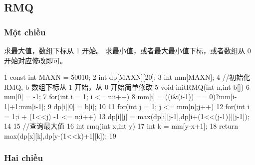 \documentclass[11pt]{article}
\begin{document}
\subsection{RMQ}

\subsubsection{Một chiều}

\begin{Code}
     求最大值，数组下标从 1 开始。
     求最小值，或者最大最小值下标，或者数组从 0 开始对应修改即可。

 1   const int MAXN = 50010;
 2   int dp[MAXN][20];
 3   int mm[MAXN];
 4   //初始化 RMQ, b 数组下标从 1 开始，从 0 开始简单修改
 5   void initRMQ(int n,int b[]){
 6       mm[0] = -1;
 7       for(int i = 1; i <= n;i++){
 8           mm[i] = ((i&(i-1)) == 0)?mm[i-1]+1:mm[i-1];
 9           dp[i][0] = b[i];
10       }
11       for(int j = 1; j <= mm[n];j++)
12           for(int i = 1;i + (1<<j) -1 <= n;i++)
13               dp[i][j] = max(dp[i][j-1],dp[i+(1<<(j-1))][j-1]);
14   }
15   //查询最大值
16   int rmq(int x,int y){
17       int k = mm[y-x+1];
18       return max(dp[x][k],dp[y-(1<<k)+1][k]);
19   }
\end{Code}

\subsubsection{Hai chiều}
\end{document}

